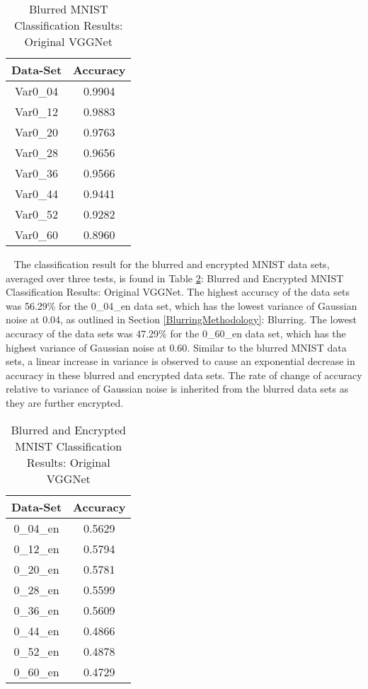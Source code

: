 \documentclass[12pt, titlepage]{article}
\begin{document}
\begin{table}[!h]
	\begin{center}
		\begin{tabular}{| c | c |}
			\hline
			\textbf{Data-Set} & \textbf{Accuracy}\\
			\hline
			Var0\_04 & 0.9904\\
			\hline
			Var0\_12 & 0.9883\\
			\hline
			Var0\_20 & 0.9763\\
			\hline
			Var0\_28 & 0.9656\\
			\hline
			Var0\_36 & 0.9566\\
			\hline
			Var0\_44 & 0.9441\\
			\hline
			Var0\_52 & 0.9282\\
			\hline
			Var0\_60 & 0.8960\\
			\hline
		\end{tabular}
		\caption{Blurred MNIST Classification Results: Original VGGNet}
		\label{table:basicVGG_Blurred}
	\end{center}
\end{table}

~\newpage
\noindent The classification result for the blurred and encrypted MNIST data sets, averaged over three tests, is found in Table \ref{table:basicVGG_BlurredEncrypted}: Blurred and Encrypted MNIST Classification Results: Original VGGNet. The highest accuracy of the data sets was 56.29\% for the 0\_04\_en data set, which has the lowest variance of Gaussian noise at 0.04, as outlined in Section \ref{BlurringMethodology}: Blurring. The lowest accuracy of the data sets was 47.29\% for the 0\_60\_en data set, which has the highest variance of Gaussian noise at 0.60. Similar to the blurred MNIST data sets, a linear increase in variance is observed to cause an exponential decrease in accuracy in these blurred and encrypted data sets. The rate of change of accuracy relative to variance of Gaussian noise is inherited from the blurred data sets as they are further encrypted.\\ 

\begin{table}[!h]
	\begin{center}
		\begin{tabular}{| c | c |}
			\hline
			\textbf{Data-Set} & \textbf{Accuracy}\\
			\hline
			0\_04\_en & 0.5629\\
			\hline
			0\_12\_en & 0.5794\\
			\hline
			0\_20\_en & 0.5781\\
			\hline
			0\_28\_en & 0.5599\\
			\hline
			0\_36\_en & 0.5609\\
			\hline
			0\_44\_en & 0.4866\\
			\hline
			0\_52\_en & 0.4878\\
			\hline
			0\_60\_en & 0.4729\\
			\hline
		\end{tabular}
		\caption{Blurred and Encrypted MNIST Classification Results: Original VGGNet}
		\label{table:basicVGG_BlurredEncrypted}
	\end{center}
\end{table}
\end{document}
